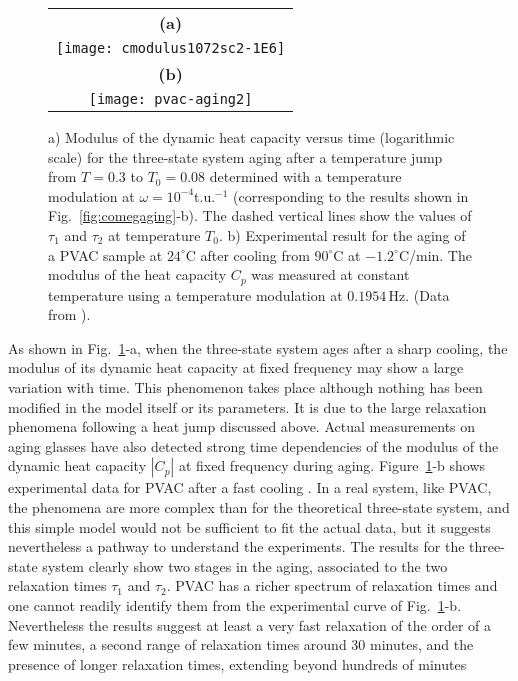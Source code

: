 \documentclass[pre,a4paper,twocolumn,superscriptaddress,%
floatfix]{revtex4}
\begin{document}
\begin{figure}[h]
  \centering
  \begin{tabular}{c}
  \textbf{(a)} \\
  \texttt{[image: cmodulus1072sc2-1E6]} \\
    \textbf{(b)} \\
  \texttt{[image: pvac-aging2]}
    \end{tabular}
  \caption{a) Modulus of the dynamic
    heat capacity versus time (logarithmic
    scale) for the three-state system aging after a temperature jump
    from $T=0.3$ to $T_0 = 0.08$ determined with a temperature modulation at
  $\omega = 10^{-4}$t.u.$^{-1}$ (corresponding to the results shown in
  Fig.~\ref{fig:comegaging}-b). The dashed vertical lines show the values of
  $\tau_1$ and $\tau_2$ at temperature $T_0$.
  b) Experimental result for the aging of a PVAC sample
  at $24^{\circ}$C after cooling from $90^{\circ}$C at $-1.2^{\circ}$C/min.
  The modulus of the heat capacity $C_p$ was measured at constant temperature
  using a temperature modulation at $0.1954\,$Hz.
  (Data from \cite{LAARRAJ}).
}
  \label{fig:ClogtPVAC}
\end{figure}
As shown in Fig.~\ref{fig:ClogtPVAC}-a, when the three-state system ages after
a sharp cooling, the modulus of its dynamic heat capacity at fixed frequency
may show a large variation with time. This phenomenon takes place although
nothing has been modified in the model itself or its parameters. It is due to
the large relaxation phenomena following a heat jump discussed above. Actual
measurements on aging glasses have also detected strong time dependencies of
the modulus of the dynamic heat capacity $|C_p|$ at fixed frequency during
aging. Figure~\ref{fig:ClogtPVAC}-b shows experimental data for PVAC after a
fast cooling \cite{LAARRAJ}. In a real system, like PVAC, the phenomena are
more complex than for the theoretical three-state system, and this simple
model would not be sufficient to fit the actual data, but it suggests
nevertheless a pathway to understand the experiments.
The results for the
three-state system clearly show two stages in the aging, associated to the two
relaxation times $\tau_1$ and $\tau_2$. PVAC has a richer spectrum of
relaxation times and one cannot readily identify them from
the experimental curve of Fig.~\ref{fig:ClogtPVAC}-b. Nevertheless
the results suggest at least a very fast relaxation of the order of a few
minutes, a second range of relaxation times around 30 minutes, and the
presence of longer relaxation times, extending beyond hundreds of minutes
\end{document}
